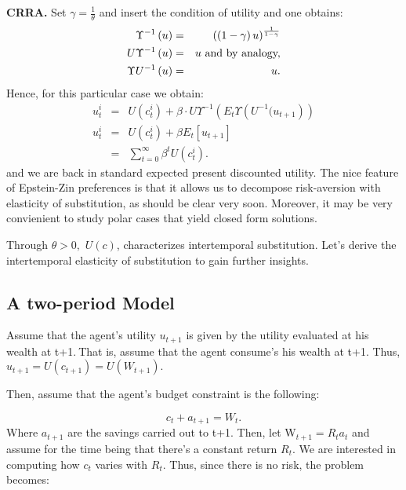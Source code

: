 \documentclass{article}
\begin{document}
\textbf{CRRA. }Set $\gamma =\frac{1}{\theta }$ and insert the condition of
utility and one obtains:%
\begin{eqnarray*}
\Upsilon ^{-1}\left( u\right) &=&\left( \left( 1-\gamma \right) u\right) ^{%
\frac{1}{1-\gamma }} \\
U\Upsilon ^{-1}\left( u\right) &=&u\text{ and by analogy,} \\
\Upsilon U^{-1}\left( u\right) &=&u.
\end{eqnarray*}%
Hence, for this particular case we obtain:%
\begin{eqnarray*}
u_{t}^{i} &=&U\left( c_{t}^{i}\right) +\beta \cdot U\Upsilon ^{-1}\left(
E_{t}\Upsilon \left( U^{-1}(u_{t+1}\right) \right) \\
u_{t}^{i} &=&U\left( c_{t}^{i}\right) +\beta E_{t}\left[ u_{t+1}\right] \\
&=&\sum_{t=0}^{\infty }\beta ^{t}U\left( c_{t}^{i}\right) .
\end{eqnarray*}%
and we are back in standard expected present discounted utility. The nice
feature of Epstein-Zin preferences is that it allows us to decompose
risk-aversion with elasticity of substitution, as should be clear very soon.
Moreover, it may be very convienient to study polar cases that yield closed
form solutions.

Through $\theta >0,$ $U\left( c\right) $, characterizes intertemporal
substitution. Let's derive the intertemporal elasticity of substitution to
gain further insights.

\subsection{A two-period Model}

Assume that the agent's utility $u_{t+1}$ is given by the utility evaluated
at his wealth at t+1.$~$That is, assume that the agent consume's his wealth
at t+1. Thus, $u_{t+1}=U\left( c_{t+1}\right) =U\left( W_{t+1}\right) .$

Then, assume that the agent's budget constraint is the following:

\begin{equation*}
c_{t}+a_{t+1}=W_{t}.
\end{equation*}%
Where $a_{t+1}$ are the savings carried out to t+1. Then, let W$%
_{t+1}=R_{t}a_{t}$ and assume for the time being that there's a constant
return $R_{t}.$ We are interested in computing how $c_{t}$ varies with $%
R_{t}.$ Thus, since there is no risk, the problem becomes:
\end{document}
